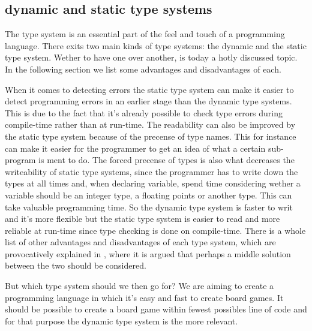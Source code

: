 \subsection{dynamic and static type systems}

The type system is an essential part of the feel and touch of a programming language. There exits two main kinds of type systems: the dynamic and the static type system. Wether to have one over another, is today a hotly discussed topic. In the following section we list some advantages and disadvantages of each. 

When it comes to detecting errors the static type system can make it easier to detect programming errors in an earlier stage than the dynamic type systems. This is due to the fact that it's already possible to check type errors during compile-time rather than at run-time. The readability can also be improved by the static type system because of the precense of type names. This for instance can make it easier for the programmer to get an idea of what a certain sub-program is ment to do. The forced precense of types is also what decreases the writeability of static type systems, since the programmer has to write down the types at all times and, when declaring variable, spend time considering wether a variable should be an integer type, a floating points or another type. This can take valuable programming time. So the dynamic type system is faster to writ and it's more flexible but the static type system is easier to read and more reliable at run-time since type checking is done on compile-time. There is a whole list of other advantages and disadvantages of each type system, which are provocatively explained in \cite{staticvsdynamictypesystem}, where it is argued that perhaps a middle solution between the two should be considered.

But which type system should we then go for? We are aiming to create a programming language in which it's easy and fast to create board games. It should be possible to create a board game within fewest possibles line of code and for that purpose the dynamic type system is the more relevant. 